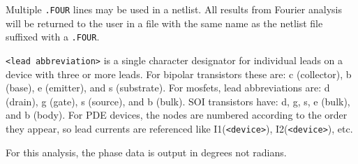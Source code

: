 \begin{Command}
\begin {Arguments}
\end{Arguments}

\comments
Multiple \texttt{.FOUR} lines may be used in a netlist.  All results from Fourier analysis will be 
returned to the user in a file with the same name as the netlist file suffixed with a \texttt{.FOUR}. 

\texttt{<lead abbreviation>} is a single character designator for individual
leads on a device with three or more leads.  For bipolar transistors these are:
c (collector), b (base), e (emitter), and s (substrate).  For mosfets, lead
abbreviations are: d (drain), g (gate), s (source), and b (bulk).  SOI
transistors have: d, g, s, e (bulk), and b (body).  For PDE devices, the nodes
are numbered according to the order they appear, so lead currents are
referenced like I1(\texttt{<device>}), I2(\texttt{<device>}), etc.

For this analysis, the phase data is output in degrees not radians.

\end{Command}

